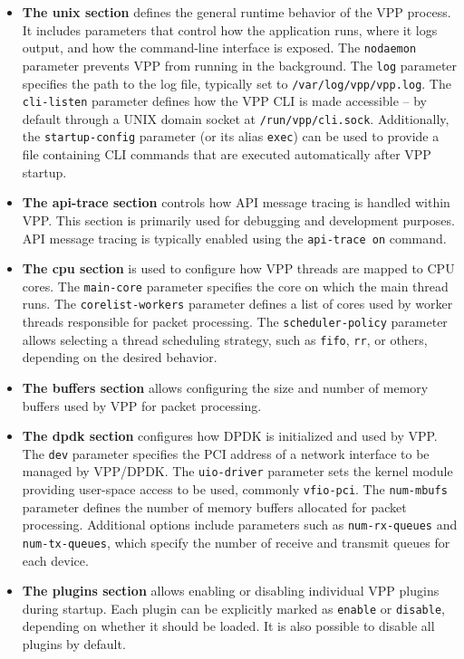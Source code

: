 \begin{itemize}
  \item \textbf{The unix section} defines the general runtime behavior of the VPP process. 
It includes parameters that control how the application runs, where it logs output, and how the command-line interface is exposed. 
The \texttt{nodaemon} parameter prevents VPP from running in the background. 
The \texttt{log} parameter specifies the path to the log file, typically set to \texttt{/var/log/vpp/vpp.log}. 
The \texttt{cli-listen} parameter defines how the VPP CLI is made accessible -- by default through a UNIX domain socket at \texttt{/run/vpp/cli.sock}. 
Additionally, the \texttt{startup-config} parameter (or its alias \texttt{exec}) can be used to provide a file containing CLI commands 
that are executed automatically after VPP startup.~\cite{fdio-config-reference}

  \item \textbf{The api-trace section} controls how API message tracing is handled within VPP.  
This section is primarily used for debugging and development purposes. 
API message tracing is typically enabled using the \texttt{api-trace on} command.~\cite{fdio-config-reference}

  \item \textbf{The cpu section} is used to configure how VPP threads are mapped to CPU cores.  
The \texttt{main-core} parameter specifies the core on which the main thread runs.  
The \texttt{corelist-workers} parameter defines a list of cores used by worker threads responsible for packet processing.  
The \texttt{scheduler-policy} parameter allows selecting a thread scheduling strategy, such as \texttt{fifo}, \texttt{rr}, or others, depending on the desired behavior.~\cite{fdio-config-reference}

  \item \textbf{The buffers section} allows configuring the size and number of memory buffers used by VPP for packet processing.~\cite{fdio-config-reference}  

  \item \textbf{The dpdk section} configures how DPDK is initialized and used by VPP.
The \texttt{dev} parameter specifies the PCI address of a network interface to be managed by VPP/DPDK.  
The \texttt{uio-driver} parameter sets the kernel module providing user-space access to be used, commonly \texttt{vfio-pci}.  
The \texttt{num-mbufs} parameter defines the number of memory buffers allocated for packet processing.  
Additional options include parameters such as \texttt{num-rx-queues} and \texttt{num-tx-queues}, which specify the number of receive and transmit queues for each device.~\cite{fdio-config-reference}

  \item \textbf{The plugins section} allows enabling or disabling individual VPP plugins during startup.  
Each plugin can be explicitly marked as \texttt{enable} or \texttt{disable}, depending on whether it should be loaded. It is also possible to disable all plugins by default.~\cite{fdio-config-reference}  

\end{itemize}


